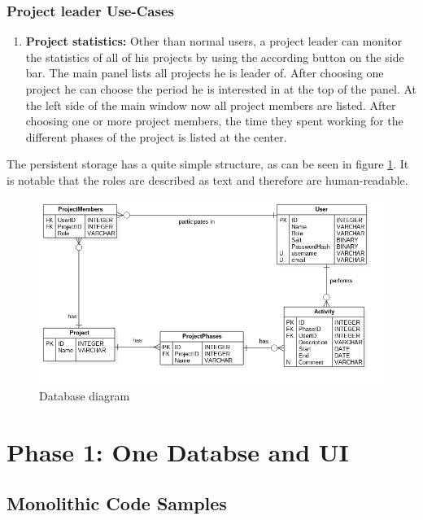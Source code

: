 \subsubsection{Project leader Use-Cases}
\begin{enumerate}
\item \textbf{Project statistics:} Other than normal users, a project leader can monitor the statistics of all of his projects by using the according button on the side bar. The main panel lists all projects he is leader of. After choosing one project he can choose the period he is interested in at the top of the panel. At the left side of the main window now all project members are listed. After choosing one or more project members, the time they spent working for the different phases of the project is listed at the center.
\end{enumerate}


The persistent storage has a quite simple structure, as can be seen in figure \ref{fig:database}. It is notable that the roles are described as text and therefore are human-readable. 
\begin{figure}[htbp]
\includegraphics[width=\textwidth]{./content/pictures/database.png}
\caption{Database diagram}
\label{fig:database}
\end{figure}

\clearpage

\section{Phase 1: One Databse and UI}
\subsection{Monolithic Code Samples}

